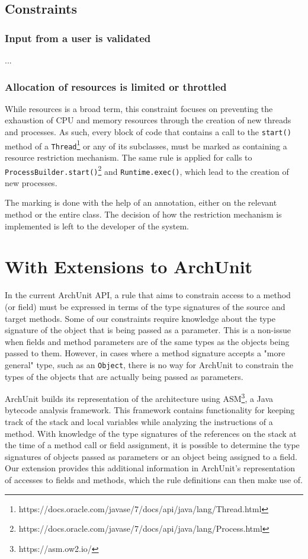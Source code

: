 \subsection{Constraints}

\subsubsection*{Input from a user is validated}
...

\subsubsection*{Allocation of resources is limited or throttled}
While resources is a broad term, this constraint focuses on preventing the exhaustion of CPU and memory resources through the creation of new threads and processes. As such, every block of code that contains a call to the \texttt{start()} method of a \texttt{Thread}\footnote{https://docs.oracle.com/javase/7/docs/api/java/lang/Thread.html} or any of its subclasses, must be marked as containing a resource restriction mechanism. The same rule is applied for calls to \texttt{ProcessBuilder.start()}\footnote{https://docs.oracle.com/javase/7/docs/api/java/lang/Process.html} and \texttt{Runtime.exec()}\footnotemark[3], which lead to the creation of new processes.

The marking is done with the help of an annotation, either on the relevant method or the entire class. The decision of how the restriction mechanism is implemented is left to the developer of the system.

\section{With Extensions to ArchUnit}

In the current ArchUnit API, a rule that aims to constrain access to a method (or field) must be expressed in terms of the type signatures of the source and target methods. Some of our constraints require knowledge about the type signature of the object that is being passed as a parameter. This is a non-issue when fields and method parameters are of the same types as the objects being passed to them. However, in cases where a method signature accepts a "more general" type, such as an \texttt{Object}, there is no way for ArchUnit to constrain the types of the objects that are actually being passed as parameters.

ArchUnit builds its representation of the architecture using ASM\footnote{https://asm.ow2.io/}, a Java bytecode analysis framework. This framework contains functionality for keeping track of the stack and local variables while analyzing the instructions of a method. With knowledge of the type signatures of the references on the stack at the time of a method call or field assignment, it is possible to determine the type signatures of objects passed as parameters or an object being assigned to a field. Our extension provides this additional information in ArchUnit's representation of accesses to fields and methods, which the rule definitions can then make use of.

